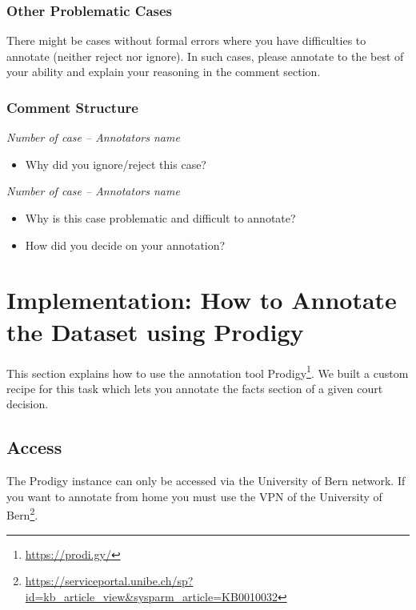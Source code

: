 \documentclass{article}
\begin{document}
\subsubsection{Other Problematic Cases}
There might be cases without formal errors where you have difficulties to annotate (neither reject nor ignore). In such cases, please annotate to the best of your ability and explain your reasoning in the comment section.
\pagebreak
\subsubsection{Comment Structure}
\begin{mdframed}[frametitle={Comment for rejecting and ignoring case}]
\emph{Number of case – Annotators name}

\begin{itemize}
	\item Why did you ignore/reject this case?
\end{itemize}	
\end{mdframed}

\begin{mdframed}[frametitle={Comment for generally problematic case}]
\emph{Number of case – Annotators name}

\begin{itemize}
	\item Why is this case problematic and difficult to annotate?

\item How did you decide on your annotation?
\end{itemize}
\end{mdframed}

\section{Implementation: How to Annotate the Dataset using Prodigy}
This section explains how to use the annotation tool Prodigy\footnote{\href{https://prodi.gy/}{https://prodi.gy/}}. We built a custom recipe for this task which lets you annotate the facts section of a given court decision.

\subsection{Access}
The Prodigy instance can only be accessed via the University of Bern network. If you want to annotate from home you must use the VPN of the University of Bern\footnote{\href{https://serviceportal.unibe.ch/sp?id=kb_article_view&sysparm_article=KB0010032}{https://serviceportal.unibe.ch/sp?id=kb_article_view&sysparm_article=KB0010032}}.
\end{document}
